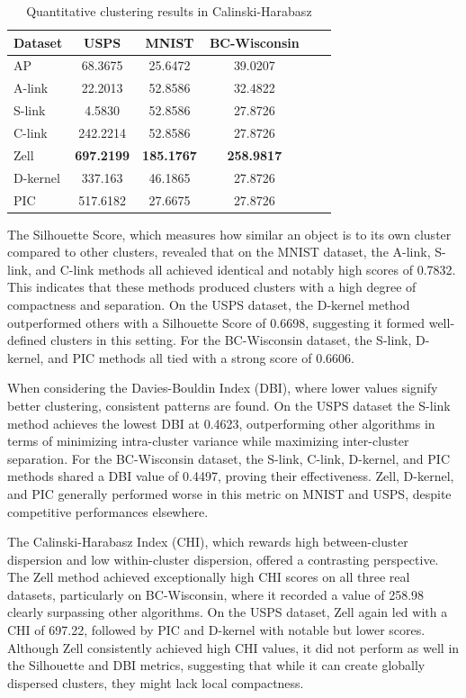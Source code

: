 \documentclass[
	10pt,
	parskip=half-,	
	paper=a4,
	english
	]{scrartcl}
\begin{document}
\begin{table}[h]
    \centering
    \caption{Quantitative clustering results in Calinski-Harabasz}
    \begin{tabular}{lccccc}
    \toprule
    \textbf{Dataset} & \textbf{USPS} & \textbf{MNIST} & \textbf{BC-Wisconsin} \\
    \midrule
    AP       & 68.3675   & 25.6472 & 39.0207 \\
    A-link   & 22.2013  & 52.8586 & 32.4822   \\
    S-link   & 4.5830   & 52.8586 & 27.8726 \\
    C-link   & 242.2214   & 52.8586 & 27.8726 \\
    Zell     & \textbf{697.2199}   & \textbf{185.1767} & \textbf{258.9817} \\
    D-kernel & 337.163   & 46.1865 & 27.8726 \\
    PIC      & 517.6182 & 27.6675 & 27.8726 \\
    \bottomrule
    \end{tabular}
    \label{tab:CH}
\end{table}

The Silhouette Score, which measures how similar an object is to its own cluster compared to other clusters, revealed that on the MNIST dataset, the A-link, S-link, and C-link methods all achieved identical and notably high scores of 0.7832. This indicates that these methods produced clusters with a high degree of compactness and separation. On the USPS dataset, the D-kernel method outperformed others with a Silhouette Score of 0.6698, suggesting it formed well-defined clusters in this setting. For the BC-Wisconsin dataset, the S-link, D-kernel, and PIC methods all tied with a strong score of 0.6606.

When considering the Davies-Bouldin Index (DBI), where lower values signify better clustering, consistent patterns are found. On the USPS dataset the S-link method achieves the lowest DBI at 0.4623, outperforming other algorithms in terms of minimizing intra-cluster variance while maximizing inter-cluster separation. For the BC-Wisconsin dataset, the S-link, C-link, D-kernel, and PIC methods shared a DBI value of 0.4497, proving their effectiveness. Zell, D-kernel, and PIC generally performed worse in this metric on MNIST and USPS, despite competitive performances elsewhere.

The Calinski-Harabasz Index (CHI), which rewards high between-cluster dispersion and low within-cluster dispersion, offered a contrasting perspective. The Zell method achieved exceptionally high CHI scores on all three real datasets, particularly on BC-Wisconsin, where it recorded a value of 258.98 clearly surpassing other algorithms. On the USPS dataset, Zell again led with a CHI of 697.22, followed by PIC and D-kernel with notable but lower scores. Although Zell consistently achieved high CHI values, it did not perform as well in the Silhouette and DBI metrics, suggesting that while it can create globally dispersed clusters, they might lack local compactness.
\end{document}
